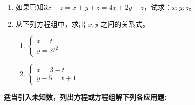 \begin{enumerate}
\item 如果已知$3x-z=x+y+z=4x+2y-z$，试求：$x:y:z$。

\item 从下列方程组中，求出 $x,y$ 之间的关系式。
\begin{multicols}{2}
\begin{enumerate}
    \item $\begin{cases}
        x=t\\ y=2t^2
    \end{cases}$
    \item $\begin{cases}
        x=3-t\\ y-5=t+1
    \end{cases}$
\end{enumerate}
\end{multicols}

\end{enumerate}

\textbf{适当引入未知数，列出方程或方程组解下列各应用题:
}

